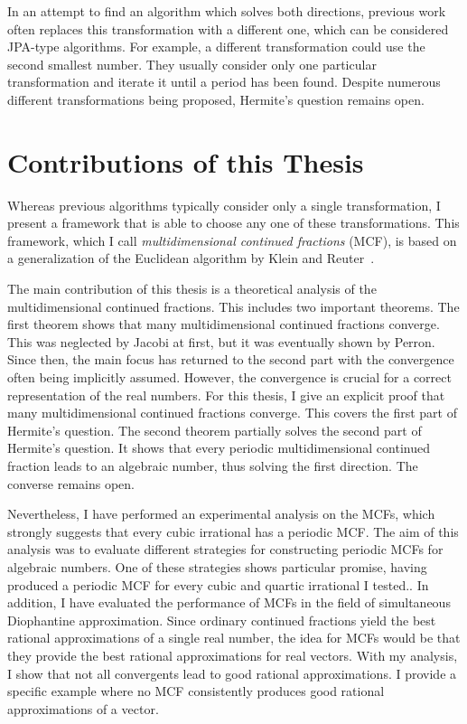 In an attempt to find an algorithm which solves both directions,
previous work often replaces this transformation with a different one,
which can be considered JPA-type algorithms.
For example, a different transformation could use the second smallest number.
They usually consider only one particular transformation and iterate it until a period has been found.
Despite numerous different transformations being proposed,
Hermite's question remains open.

\section{Contributions of this Thesis}
\label{sec:contributions}

Whereas previous algorithms typically consider only a single transformation,
I present a framework that is able to choose any one of these transformations.
This framework, which I call \emph{multidimensional continued fractions} (MCF),
is based on a generalization of the Euclidean algorithm by Klein and
Reuter~\cite{Klein24}.

The main contribution of this thesis is a theoretical analysis of the
multidimensional continued fractions.
This includes two important theorems.
The first theorem shows that many multidimensional continued fractions converge.
This was neglected by Jacobi at first, but it was eventually shown by Perron.
Since then, the main focus has returned to the second part
with the convergence often being implicitly assumed.
However, the convergence is crucial for a correct representation of the real numbers.
For this thesis, I give an explicit proof that many multidimensional continued
fractions converge.
This covers the first part of Hermite's question.
The second theorem partially solves the second part of Hermite's question.
It shows that every periodic multidimensional continued fraction leads to an
algebraic number, thus solving the first direction.
The converse remains open.

Nevertheless, I have performed an experimental analysis on the MCFs,
which strongly suggests that every cubic irrational has a periodic MCF.
The aim of this analysis was to evaluate different strategies
for constructing periodic MCFs for algebraic numbers.
One of these strategies shows particular promise, having produced a periodic
MCF for every cubic and quartic irrational I tested..
In addition, I have evaluated the performance of MCFs in the field of
simultaneous Diophantine approximation.
Since ordinary continued fractions yield the best rational approximations
of a single real number, the idea for MCFs would be that they provide the best
rational approximations for real vectors.
With my analysis, I show that not all convergents lead to good rational approximations.
I provide a specific example where no MCF consistently produces good rational
approximations of a vector.

